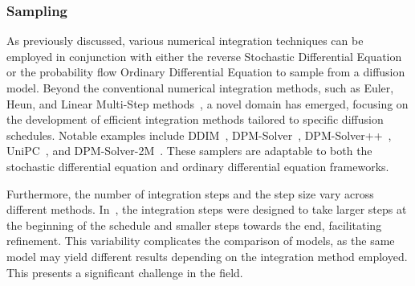\subsubsection{Sampling}

As previously discussed, various numerical integration techniques can be employed in conjunction with either the reverse Stochastic Differential Equation or the probability flow Ordinary Differential Equation to sample from a diffusion model. Beyond the conventional numerical integration methods, such as Euler, Heun, and Linear Multi-Step methods~\cite{heun}, a novel domain has emerged, focusing on the development of efficient integration methods tailored to specific diffusion schedules. Notable examples include DDIM~\cite{DDIM}, DPM-Solver~\cite{DPMSolverFastODE}, DPM-Solver++~\cite{DPMSolverFastSolver}, UniPC~\cite{UniPC}, and DPM-Solver-2M~\cite{DPMSolverFastSolver}. These samplers are adaptable to both the stochastic differential equation and ordinary differential equation frameworks.

Furthermore, the number of integration steps and the step size vary across different methods. In~\cite{ElucidatingDesignSpace}, the integration steps were designed to take larger steps at the beginning of the schedule and smaller steps towards the end, facilitating refinement. This variability complicates the comparison of models, as the same model may yield different results depending on the integration method employed. This presents a significant challenge in the field.
